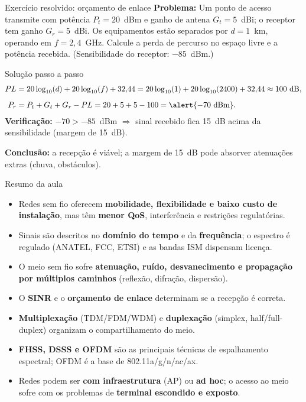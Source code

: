 \documentclass[aspectratio=169,11pt]{beamer}
\begin{document}
\begin{frame}{Exercício resolvido: orçamento de enlace}
  \textbf{Problema:} Um ponto de acesso transmite com potência $P_t = 20$~dBm e ganho de antena $G_t = 5$~dBi; o receptor tem ganho $G_r = 5$~dBi. Os equipamentos estão separados por $d = 1$~km, operando em $f = 2{,}4$~GHz. Calcule a perda de percurso no espaço livre e a potência recebida. (Sensibilidade do receptor: $-85$~dBm.)
  \pause
  \begin{block}{Solução passo a passo}
    \begin{align*}
      PL &= 20\log_{10}(d) + 20\log_{10}(f) + 32{,}44
      = 20\log_{10}(1) + 20\log_{10}(2400) + 32{,}44
      \approx 100~\text{dB},\\[2mm]
      P_r &= P_t + G_t + G_r - PL
      = 20 + 5 + 5 - 100 = \alert{-70~\text{dBm}}.
    \end{align*}
    \textbf{Verificação:} $-70 > -85$~dBm $\Rightarrow$ sinal recebido fica \alert{15~dB acima da sensibilidade} (margem de 15~dB).
  \end{block}
  \pause
  \textbf{Conclusão:} a recepção é viável; a margem de 15~dB pode absorver atenuações extras (chuva, obstáculos).
\end{frame}

\begin{frame}{Resumo da aula}
  \begin{itemize}
    \item Redes sem fio oferecem \textbf{mobilidade, flexibilidade e baixo custo de instalação}, mas têm \textbf{menor QoS}, interferência e restrições regulatórias.
    \item Sinais são descritos no \textbf{domínio do tempo} e da \textbf{frequência}; o espectro é regulado (ANATEL, FCC, ETSI) e as bandas ISM dispensam licença.
    \item O meio sem fio sofre \textbf{atenuação, ruído, desvanecimento e propagação por múltiplos caminhos} (reflexão, difração, dispersão).
    \item O \textbf{SINR} e o \textbf{orçamento de enlace} determinam se a recepção é correta.
    \item \textbf{Multiplexação} (TDM/FDM/WDM) e \textbf{duplexação} (simplex, half/full-duplex) organizam o compartilhamento do meio.
    \item \textbf{FHSS, DSSS e OFDM} são as principais técnicas de espalhamento espectral; OFDM é a base de 802.11a/g/n/ac/ax.
    \item Redes podem ser \textbf{com infraestrutura} (AP) ou \textbf{ad hoc}; o acesso ao meio sofre com os problemas de \textbf{terminal escondido e exposto}.
  \end{itemize}
\end{frame}
\end{document}

